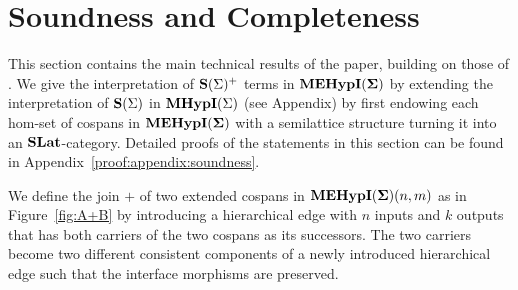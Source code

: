 \section{Soundness and Completeness}\label{sec:soundness-and-completeness}

This section contains the main technical results of the paper,  building on those of \cite{bonchi_string_2022-2}.
We give the interpretation of $\mathbf{S}(\Sigma)^{+}$ terms in ${\mathbf{MEHypI(\Sigma)}}$ by extending the interpretation of $\mathbf{S}(\Sigma)$ in $\textbf{MHypI}(\Sigma)$ (see Appendix) by first endowing each hom-set of cospans in ${\mathbf{MEHypI(\Sigma)}}$ with a semilattice structure turning it into an $\mathbf{SLat}$-category.
Detailed proofs of the statements in this section can be found in Appendix~\ref{proof:appendix:soundness}.


\begin{definition}
We define the join $+$ of two extended cospans in ${\mathbf{MEHypI(\Sigma)}}(n,m)$ as in Figure~\ref{fig:A+B}
by introducing a hierarchical edge with $n$ inputs and $k$ outputs that has both carriers of the two cospans as its successors.
The two carriers become two different consistent components of a newly introduced hierarchical edge such that the interface morphisms are preserved.

\end{definition}

